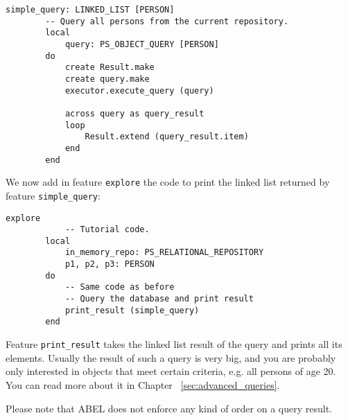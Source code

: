 \documentclass[a4paper,12pt]{report}
\begin{document}
\begin{lstlisting}[language=OOSC2Eiffel, captionpos=b, caption={A simple query.}, label={lst:simple_query}]
	simple_query: LINKED_LIST [PERSON]
		-- Query all persons from the current repository.
		local
			query: PS_OBJECT_QUERY [PERSON]
		do
			create Result.make
			create query.make
			executor.execute_query (query)

			across query as	query_result
			loop
				Result.extend (query_result.item)
			end
		end
\end{lstlisting}
We now add in feature \lstinline{explore} the code to print the linked list returned by feature \lstinline{simple_query}:  
\begin{lstlisting}[language=OOSC2Eiffel, captionpos=b, caption={Printing the query result.}, label={lst:tutorial_print_result}]
	explore
			-- Tutorial code.
		local
			in_memory_repo: PS_RELATIONAL_REPOSITORY
			p1, p2, p3: PERSON
		do
			-- Same code as before
			-- Query the database and print result
			print_result (simple_query)
		end
\end{lstlisting}
Feature  \lstinline{print_result} takes the linked list result of the query and prints all its elements.
Usually the result of such a query is very big, and you are probably only interested in objects that meet certain criteria, e.g. all persons of age 20. You can read more about it in Chapter ~\ref{sec:advanced_queries}.

Please note that ABEL does not enforce any kind of order on a query result.

%
%
%
%
\end{document}
